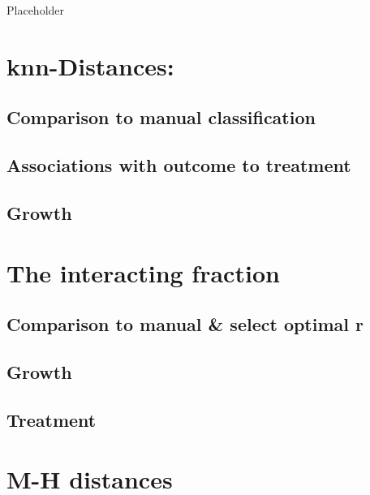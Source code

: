 \documentclass[
]{book}
\begin{document}
Placeholder

\hypertarget{knn-distances}{%
\section{knn-Distances:}\label{knn-distances}}

\hypertarget{comparison-to-manual-classification}{%
\subsection{Comparison to manual classification}\label{comparison-to-manual-classification}}

\hypertarget{associations-with-outcome-to-treatment}{%
\subsection{Associations with outcome to treatment}\label{associations-with-outcome-to-treatment}}

\hypertarget{growth}{%
\subsection{Growth}\label{growth}}

\hypertarget{the-interacting-fraction}{%
\section{The interacting fraction}\label{the-interacting-fraction}}

\hypertarget{comparison-to-manual-select-optimal-r}{%
\subsection{Comparison to manual \& select optimal r}\label{comparison-to-manual-select-optimal-r}}

\hypertarget{growth-1}{%
\subsection{Growth}\label{growth-1}}

\hypertarget{treatment}{%
\subsection{Treatment}\label{treatment}}

\hypertarget{m-h-distances}{%
\section{M-H distances}\label{m-h-distances}}
\end{document}
